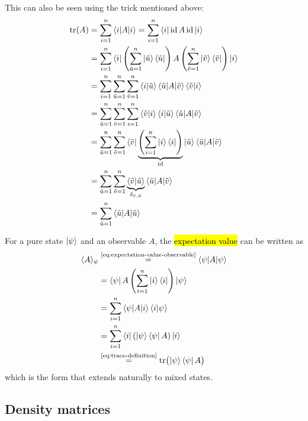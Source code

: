 This can also be seen using the trick mentioned above:
\begingroup
\allowdisplaybreaks
\begin{align*}
\operatorname{tr}(A)
&=
\sum_{i=1}^n \braket{i|A|i}
=
\sum_{i=1}^n \bra{i} \operatorname{id} A \operatorname{id}  \ket{i} \\
&=
\sum_{i=1}^n \bra{i} \left(\sum_{\tilde{u} = 1}^n \ket{\tilde{u}}\bra{\tilde{u}}\right) A \left(\sum_{\tilde{v} = 1}^n \ket{\tilde{v}}\bra{\tilde{v}}\right) \ket{i} \\
&=
\sum_{i=1}^n \sum_{\tilde{u} = 1}^n \sum_{\tilde{v} = 1}^n \braket{i|\tilde{u}} \braket{\tilde{u}|A|\tilde{v}} \braket{\tilde{v}|i} \\
&=
\sum_{\tilde{u} = 1}^n \sum_{\tilde{v} = 1}^n \sum_{i=1}^n  \braket{\tilde{v}|i} \braket{i|\tilde{u}} \braket{\tilde{u}|A|\tilde{v}}  \\
&=
\sum_{\tilde{u} = 1}^n \sum_{\tilde{v} = 1}^n   \bra{\tilde{v}} \underbrace{\left(\sum_{i=1}^n \ket{i} \bra{i} \right)}_{\operatorname{id}} \ket{\tilde{u}} \braket{\tilde{u}|A|\tilde{v}}  \\
&=
\sum_{\tilde{u} = 1}^n \sum_{\tilde{v} = 1}^n   \underbrace{\braket{\tilde{v} | \tilde{u}}}_{\delta_{\tilde{v}, \tilde{u}}} \braket{\tilde{u}|A|\tilde{v}}  \\
&=
\sum_{\tilde{u} = 1}^n \braket{\tilde{u}|A|\tilde{u}} 
\end{align*}
\endgroup


For a pure state $\ket{\psi}$ and an observable $A$, the \hl{expectation value} can be written as
\[
\begin{aligned}
\langle A \rangle_{\psi}
&\overset{\text{\eqref{eq:expectation-value-observable}}}{=}
\braket{\psi|A|\psi} \\
&=
\bra{\psi} A \left(\sum_{i=1}^n \ket{i}\bra{i}\right) \ket{\psi} \\
&=
\sum_{i=1}^n \braket{\psi | A | i} \braket{i | \psi} \\
&= 
\sum_{i=1}^n \braket{i | \left(\ket{\psi} \bra{\psi} A \right) | i} \\
&\overset{\text{\eqref{eq:trace-definition}}}{=}
\operatorname{tr}\bigl(\ket{\psi}\bra{\psi}A\bigr)
\end{aligned}
\]
which is the form that extends naturally to mixed states.  %



\subsection{Density matrices}\label{sec:density-matrices}

